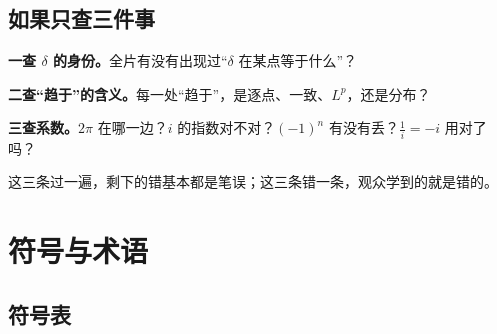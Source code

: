 \section{如果只查三件事}

\begin{center}
\begin{tcolorbox}[colback=softred,colframe=warnred!55,boxrule=0pt,arc=2pt,width=0.95\textwidth]
\small
\textbf{一查 $\delta$ 的身份。}全片有没有出现过“$\delta$ 在某点等于什么”？

\textbf{二查“趋于”的含义。}每一处“趋于”，是逐点、一致、$L^{p}$，还是分布？

\textbf{三查系数。}$2\pi$ 在哪一边？$i$ 的指数对不对？$(-1)^{n}$ 有没有丢？$\frac{1}{i}=-i$ 用对了吗？
\end{tcolorbox}
\end{center}

这三条过一遍，剩下的错基本都是笔误；这三条错一条，观众学到的就是错的。
\chapter{符号与术语}

\section{符号表}

